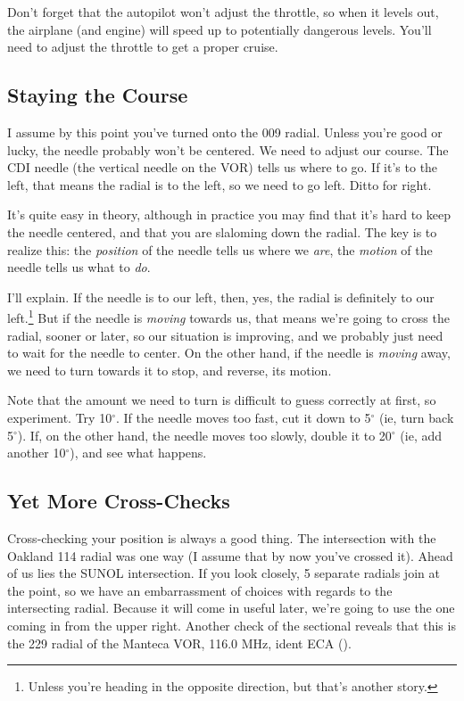 Don't forget that the autopilot won't adjust the throttle, so when it
levels out, the airplane (and engine) will speed up to potentially
dangerous levels.  You'll need to adjust the throttle to get a proper
cruise.

\subsection{Staying the Course}

I assume by this point you've turned onto the 009 radial.  Unless
you're good or lucky, the needle probably won't be centered.  We need
to adjust our course.  The CDI needle (the vertical needle on the VOR)
tells us where to go.  If it's to the left, that means the radial is
to the left, so we need to go left.  Ditto for right.

It's quite easy in theory, although in practice you may find that it's
hard to keep the needle centered, and that you are slaloming down the
radial.  The key is to realize this: the \emph{position} of the needle
tells us where we \emph{are}, the \emph{motion} of the needle tells us
what to \emph{do}.

I'll explain.  If the needle is to our left, then, yes, the radial is
definitely to our left.\footnote{Unless you're heading in the opposite
  direction, but that's another story.}  But if the needle is
\emph{moving} towards us, that means we're going to cross the radial,
sooner or later, so our situation is improving, and we probably just
need to wait for the needle to center.  On the other hand, if the
needle is \emph{moving} away, we need to turn towards it to stop, and
reverse, its motion.

Note that the amount we need to turn is difficult to guess correctly
at first, so experiment.  Try 10$^\circ$.  If the needle moves too
fast, cut it down to 5$^\circ$ (ie, turn back 5$^\circ$).  If, on the
other hand, the needle moves too slowly, double it to 20$^\circ$ (ie,
add another 10$^\circ$), and see what happens.

\subsection{Yet More Cross-Checks}

Cross-checking your position is always a good thing.  The intersection
with the Oakland 114 radial was one way (I assume that by now you've
crossed it).  Ahead of us lies the SUNOL intersection.  If you look
closely, 5 separate radials join at the point, so we have an
embarrassment of choices with regards to the intersecting radial.
Because it will come in useful later, we're going to use the one
coming in from the upper right.  Another check of the sectional
reveals that this is the 229 radial of the Manteca VOR, 116.0 MHz,
ident ECA (\mdot\mspace \mdash\mdot\mdash\mdot\mspace \mdot\mdash).

